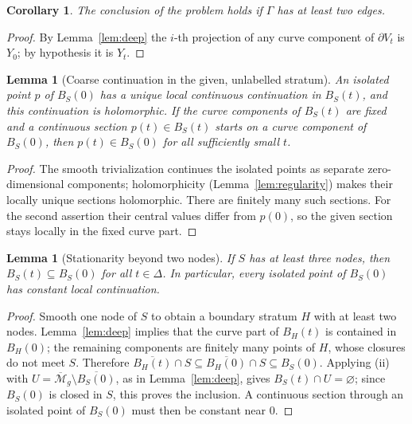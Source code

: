 \documentclass[11pt]{article}
\newcommand{\M}{\mathcal M}
\newcommand{\cl}[1]{\overline{#1}}
\newtheorem{lemma}[theorem]{Lemma}
\newtheorem{corollary}[theorem]{Corollary}
\theoremstyle{remark}
\begin{document}
\begin{corollary}\label{cor:deep}
The conclusion of the problem holds if \(\Gamma\) has at least two
edges.
\end{corollary}

\begin{proof}
By Lemma~\ref{lem:deep} the \(i\)-th projection of any curve
component of \(\partial V_t\) is \(Y_0\); by hypothesis it is \(Y_t\).
\end{proof}

\begin{lemma}[Coarse continuation in the given, unlabelled stratum]
\label{lem:isolated}
An isolated point \(p\) of \(B_S(0)\) has a unique local continuous
continuation in \(B_S(t)\), and this continuation is holomorphic.
If the curve components of \(B_S(t)\) are fixed and a continuous
section \(p(t)\in B_S(t)\) starts on a curve component of \(B_S(0)\),
then \(p(t)\in B_S(0)\) for all sufficiently small \(t\).
\end{lemma}

\begin{proof}
The smooth trivialization continues the isolated points as
separate zero-dimensional components; holomorphicity
(Lemma~\ref{lem:regularity}) makes their locally unique sections
holomorphic. There are finitely many such sections. For the second
assertion their central values differ from \(p(0)\), so the given
section stays locally in the fixed curve part.
\end{proof}

\begin{lemma}[Stationarity beyond two nodes]\label{lem:deep-points}
If \(S\) has at least three nodes, then
\(B_S(t)\subseteq B_S(0)\) for all \(t\in\Delta\).
In particular, every isolated point of \(B_S(0)\) has constant
local continuation.
\end{lemma}

\begin{proof}
Smooth one node of \(S\) to obtain a boundary stratum \(H\) with at
least two nodes. Lemma~\ref{lem:deep} implies that the curve part
of \(B_H(t)\) is contained in \(B_H(0)\); the remaining components
are finitely many points of \(H\), whose closures do not meet \(S\).
Therefore
\(\cl{B_H(t)}\cap S\subseteq\cl{B_H(0)}\cap S\subseteq B_S(0)\).
Applying (ii) with \(U=\cl{\M}_g\setminus\cl{B_S(0)}\), as in
Lemma~\ref{lem:deep}, gives \(B_S(t)\cap U=\varnothing\); since
\(B_S(0)\) is closed in \(S\), this proves the inclusion.
A continuous section through an isolated point of \(B_S(0)\)
must then be constant near \(0\).
\end{proof}
\end{document}
